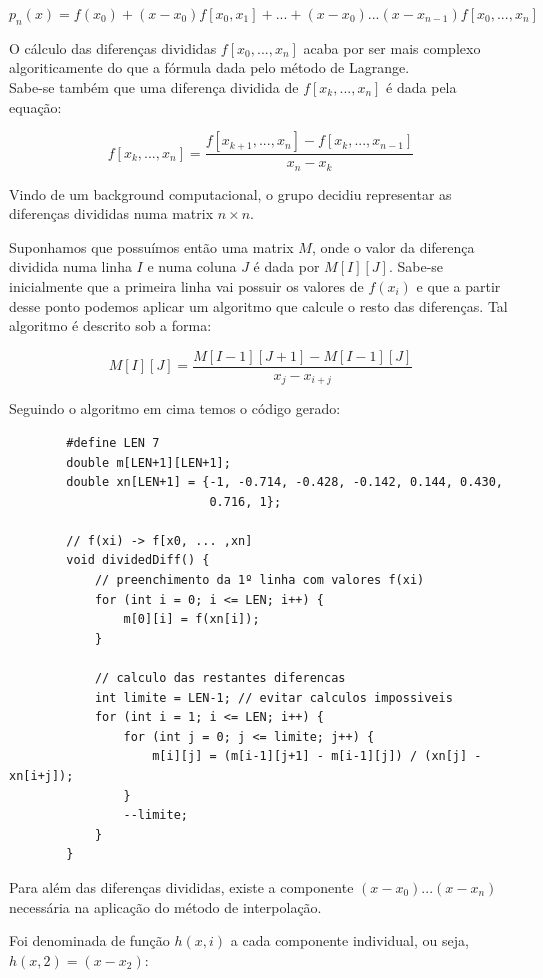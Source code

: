 \documentclass[12pt, letterpaper,fleqn]{article}
\begin{document}
\begin{itemize}
    \[p_n(x) = f(x_0) + (x-x_0)f[x_0,x_1] + ... + (x-x_0)...(x-x_{n-1})f[x_0, ... , x_n]\]

    O cálculo das diferenças divididas $f[x_0, ... , x_n]$ acaba por ser mais complexo algoriticamente do que a fórmula dada pelo método de Lagrange. \\
    
    Sabe-se também que uma diferença dividida de $f[x_k, ... , x_n]$ é dada pela equação:

    \[f[x_k, ... , x_n] = \frac{f[x_{k+1}, ... , x_n] - f[x_k, ..., x_{n-1}]}{x_n - x_k}\]

    Vindo de um background computacional, o grupo decidiu representar as diferenças divididas numa matrix $n\times n$.

    Suponhamos que possuímos então uma matrix $M$, onde o valor da diferença dividida numa linha $I$ e numa coluna $J$ é dada por $M[I][J]$.
    Sabe-se inicialmente que a primeira linha vai possuir os valores de $f(x_i)$ e que a partir desse ponto podemos aplicar um algoritmo que calcule o resto das diferenças. Tal algoritmo é descrito sob a forma:

    \[M[I][J] = \frac{M[I-1][J+1] - M[I-1][J]}{x_j - x_{i+j}}\]

    Seguindo o algoritmo em cima temos o código gerado:
    \begin{verbatim}
        #define LEN 7
        double m[LEN+1][LEN+1];
        double xn[LEN+1] = {-1, -0.714, -0.428, -0.142, 0.144, 0.430, 
                            0.716, 1};
    
        // f(xi) -> f[x0, ... ,xn]
        void dividedDiff() {
            // preenchimento da 1º linha com valores f(xi)
            for (int i = 0; i <= LEN; i++) {
                m[0][i] = f(xn[i]);
            }
        
            // calculo das restantes diferencas
            int limite = LEN-1; // evitar calculos impossiveis
            for (int i = 1; i <= LEN; i++) {
                for (int j = 0; j <= limite; j++) {
                    m[i][j] = (m[i-1][j+1] - m[i-1][j]) / (xn[j] - xn[i+j]);
                }
                --limite;
            }
        }
    \end{verbatim}

    Para além das diferenças divididas, existe a componente $(x-x_0)...(x-x_n)$ necessária na aplicação do método de interpolação.

    Foi denominada de função $h(x,i)$ a cada componente individual, ou seja, $h(x, 2) = (x-x_2)$:


\end{itemize}
\end{document}
